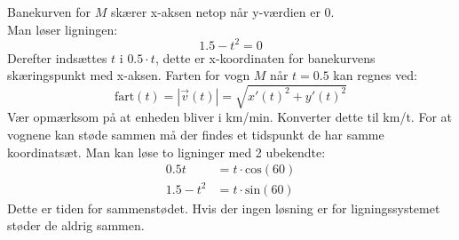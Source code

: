 \documentclass[../main.tex]{subfiles}
\begin{document}
\begin{tcolorbox}[title=Opgave 2,
    colback=blue!1!white,
    colframe=black,
    colbacktitle=blue!25!white,
    coltitle=red!25!black,
    fonttitle=\bfseries,
    subtitle style={boxrule=0.4pt,
    colback=blue!7!white} ]
        Banekurven for \(M\) skærer x-aksen netop når y-værdien er 0.\\
        Man løser ligningen: 
        \[1.5-t^2=0\]
        Derefter indsættes \(t\) i \(0.5 \cdot t\), dette er x-koordinaten for banekurvens skæringspunkt med x-aksen.
        Farten for vogn \(M\) når \(t = 0.5\) kan regnes ved:
        \[\text{fart}(t)=\left| \overrightarrow{v}(t)\right|= \sqrt{x'(t)^2+y'(t)^2}\]
        Vær opmærksom på at enheden bliver i km/min. Konverter dette til km/t.
        For at vognene kan støde sammen må der findes et tidspunkt de har samme koordinatsæt.
        Man kan løse to ligninger med 2 ubekendte:
        \begin{align}
            0.5t&=t\cdot \text{cos}(60)\\
            1.5-t^2&=t\cdot \text{sin}(60)
        \end{align}
        Dette er tiden for sammenstødet. Hvis der ingen løsning er for ligningssystemet støder de aldrig sammen.
\end{tcolorbox}
\end{document}
